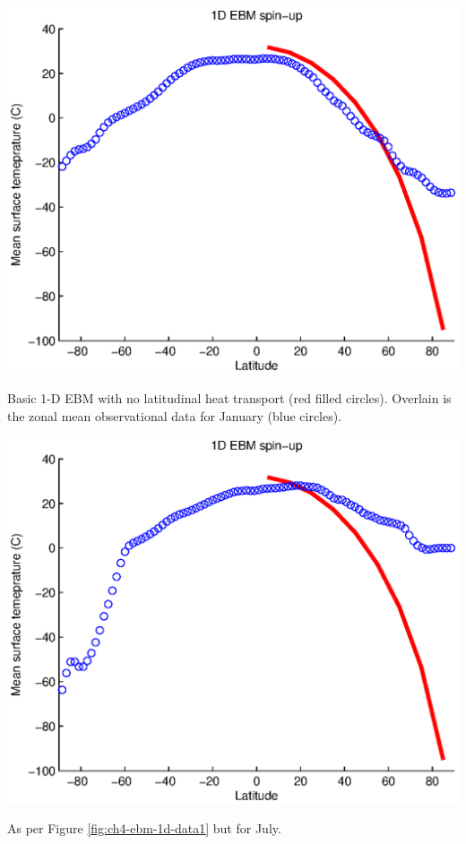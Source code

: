 \documentclass{tufte-book} %
\begin{document}
\begin{marginfigure}[-0.5in]
\includegraphics[width=\linewidth]{ch4-ebm-1d-data1.eps}
\caption{Basic 1-D EBM with no latitudinal heat transport (red filled circles). Overlain is the zonal mean observational data for January (blue circles).}
\label{fig:ch4-ebm-1d-data1}
\end{marginfigure}

\begin{marginfigure}[-0.0in]
\includegraphics[width=\linewidth]{ch4-ebm-1d-data7.eps}
\caption{As per Figure \ref{fig:ch4-ebm-1d-data1} but for July.}
\label{fig:ch4-ebm-1d-data7}
\end{marginfigure} 
\end{document}
